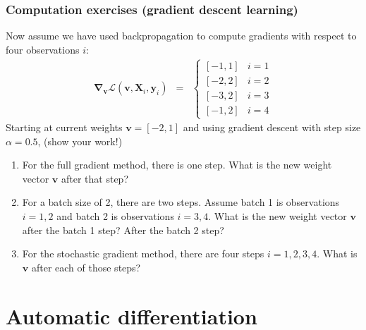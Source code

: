 \documentclass{beamer}
\begin{document}
\begin{frame}
  \frametitle{Computation exercises (gradient descent learning)}
  Now assume we have used backpropagation to compute gradients with
  respect to four observations $i$:
  \begin{eqnarray*}
    \mathbf \nabla_{\mathbf v}
    \mathcal L(\mathbf v, \mathbf X_i,\mathbf y_i)
    &=& \begin{cases}
      [-1, 1] & i=1\\
      [-2, 2] & i=2\\
      [-3, 2] & i=3\\
      [-1, 2] & i=4
    \end{cases} 
  \end{eqnarray*}
  Starting at current weights $\mathbf v=[-2, 1]$ and using gradient descent
  with step size $\alpha=0.5$,   (show your work!)

  \begin{enumerate}
  \item For the full gradient method, there is one step. What is the
    new weight vector $\mathbf v$ after that step?
  \item For a batch size of 2, there are two steps. Assume batch 1 is
    observations $i=1,2$ and batch 2 is observations $i=3,4$. What is the new
    weight vector $\mathbf v$ after the batch 1 step? After the batch
    2 step?
  \item For the stochastic gradient method, there are four steps
    $i=1,2,3,4$. What is $\mathbf v$ after each
    of those steps?
  \end{enumerate}
\end{frame}

\section{Automatic differentiation}
\end{document}

